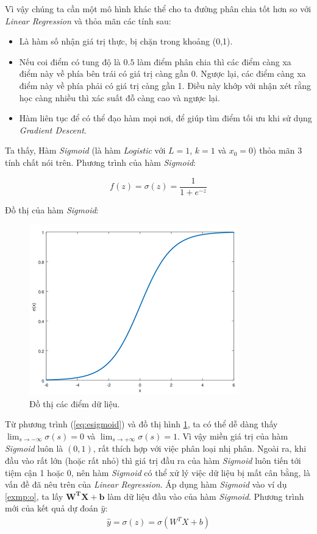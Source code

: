 Vì vậy chúng ta cần một mô hình khác thể cho ta đường phân chia tốt hơn so với \textit{Linear Regression} và thỏa mãn các tính sau:

\begin{itemize}
    \itemsep0em 
    \item Là hàm số nhận giá trị thực, bị chặn trong khoảng (0,1).
    \item Nếu coi điểm có tung độ là $0.5$ làm điểm phân chia thì các điểm càng xa điểm này về phía bên trái có giá trị càng gần $0$. Ngược lại, các điểm càng xa điểm này về phía phải có giá trị càng gần 1. Điều này khớp với nhận xét rằng học càng nhiều thì xác suất đỗ càng cao và ngược lại.
    \item Hàm liên tục để có thể đạo hàm mọi nơi, để giúp tìm điểm tối ưu khi sử dụng \textit{Gradient Descent}.
\end{itemize}

Ta thấy, Hàm \textit{Sigmoid} (là hàm \textit{Logistic} với $L = 1$, $k = 1$ và $x_{0} = 0$) thỏa mãn 3 tính chất nói trên. Phương trình của hàm \textit{Sigmoid}:

\begin{equation}
    f(z)= \sigma(z) = \frac{1}{1 + e^{-z}}
    \label{eq:esigmoid}
\end{equation}

Đồ thị của hàm \textit{Sigmoid}:
\begin{figure}[!ht]
    \centering
    \includegraphics[scale=0.8]{chapter02/figure/sigmoid.png}
    \caption{Đồ thị các điểm dữ liệu.}
    \label{fig:sigmoid}
\end{figure}

Từ phương trình (\ref{eq:esigmoid}) và đồ thị hình \ref{fig:sigmoid}, ta có thể dễ dàng thấy \newline $\lim_{s \rightarrow -\infty}\sigma(s) = 0$ và $\lim_{s \rightarrow +\infty}\sigma(s) = 1$. Vì vậy miền giá trị của hàm \textit{Sigmoid} luôn là $(0, 1)$, rất thích hợp với việc phân loại nhị phân. Ngoài ra, khi đầu vào  rất lớn (hoặc rất nhỏ) thì giá trị đầu ra của hàm \textit{Sigmoid} luôn tiến tới tiệm cận 1 hoặc 0, nên hàm \textit{Sigmoid} có thể xử lý việc dữ liệu bị mất cân bằng, là vấn đề đã nêu trên của \textit{Linear Regression}. Áp dụng hàm \textit{Sigmoid} vào ví dụ \ref{exmp:o}, ta lấy $\mathbf{W^TX + b}$ làm dữ liệu đầu vào của hàm \textit{Sigmoid}. Phương trình mới của kết quả dự đoán $\hat{y}$:
\begin{align*}
    \hat{y}= \sigma(z) = \sigma(W^TX + b)
\end{align*}
     

